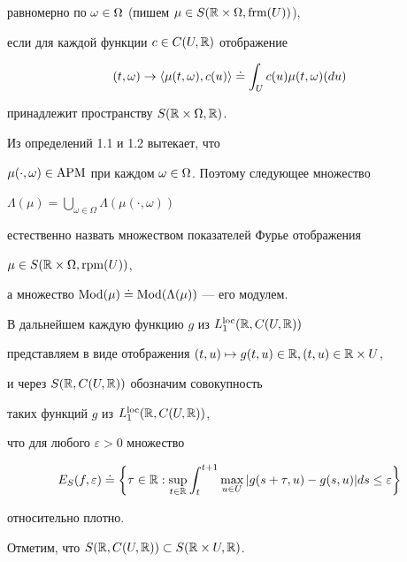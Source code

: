 равномерно по $\omega\in\Omega$ (пишем $\mu\in S(\Bbb R\times\Omega,\operatorname{frm} (U))$),


если для каждой функции $c\in C(U,\Bbb R)$ отображение


$$


\tm\to \la \mu(t,\omega),c(u)\ra\doteq


\int_{U}c(u)\mu\tm(du)


$$


принадлежит пространству $S(\Bbb R\times\Omega,\Bbb R)$.


\medskip





Из определений 1.1 и 1.2 вытекает, что 


$\mu(\cdot,\omega)\in \operatorname{APM}$ при каждом $\omega\in\Omega$. Поэтому следующее множество


$\Lambda(\mu)=\bigcup\limits_{\omega\in\Omega}\Lambda(\mu(\cdot,\omega))$


естественно назвать множеством показателей Фурье отображения


$\mu\in S(\Bbb R\times\Omega, \operatorname{rpm}(U))$,


а множество $\operatorname{Mod}(\mu)\doteq \operatorname{Mod}(\Lambda(\mu))$ --- его модулем.





В дальнейшем каждую функцию $g$ из $L_{1}^{\operatorname{loc}}(\Bbb R, C(U,\Bbb R))$


представляем в виде отображения $(t,u)\mapsto g(t,u)\in


\Bbb R,(t,u)\in\Bbb R\times U$,


и через $S(\Bbb R,C(U,\Bbb R))$ обозначим совокупность


таких функций $g$ из $L_{1}^{\operatorname{loc}}(\Bbb R,C(U,\Bbb R))$,


что для любого $\varepsilon>0$ множество


$$


E_{S}(f,\varepsilon)\doteq


\bigg\{\tau\in\Bbb R:\sup\limits_{t\in\Bbb R}


\int_{t}^{t+1}\max\limits_{u\in U}


|g(s+\tau,u)-g(s,u)|ds\le\varepsilon\bigg\}


$$


относительно плотно.


Отметим, что $S(\Bbb R,C(U,\Bbb R))\subset S(\Bbb R\times U,\Bbb R)$.


\medskip






